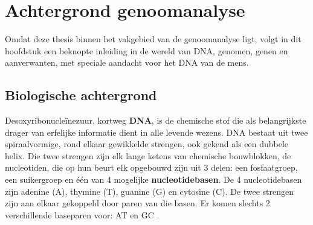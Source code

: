 \chapter{Achtergrond genoomanalyse}
\label{dna_dummies}

Omdat deze thesis binnen het vakgebied van de genoomanalyse ligt, volgt in dit hoofdstuk een beknopte inleiding in de wereld van DNA, genomen, genen en aanverwanten, met speciale aandacht voor het DNA van de mens.\\

\section{Biologische achtergrond}
\label{bio_intro}

Desoxyribonucle\"inezuur, kortweg \textbf{DNA}, is de chemische stof die als belangrijkste drager van erfelijke informatie dient in alle levende wezens. DNA bestaat uit twee spiraalvormige, rond elkaar gewikkelde strengen, ook gekend als een dubbele helix. Die twee strengen zijn elk lange ketens van chemische bouwblokken, de nucleotiden, die op hun beurt elk opgebouwd zijn uit 3 delen: een fosfaatgroep, een suikergroep en \'e\'en van 4 mogelijke \textbf{nucleotidebasen}. De 4 nucleotidebasen zijn adenine (A), thymine (T), guanine (G) en cytosine (C). De twee strengen zijn aan elkaar gekoppeld door paren van die basen. Er komen slechts 2 verschillende baseparen voor: AT en GC \cite{genome_gov} \cite{nature_scitable}.\\

